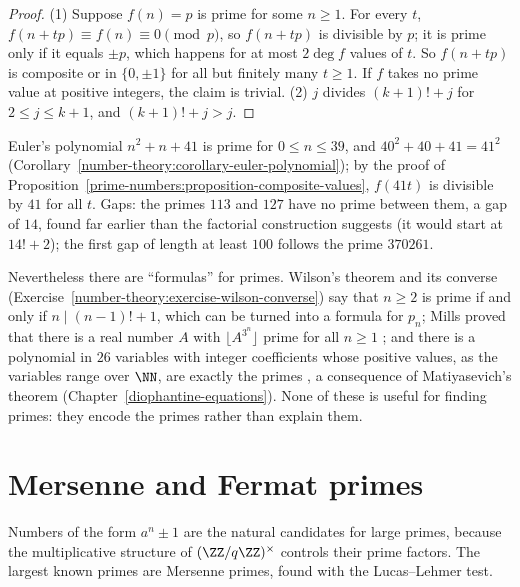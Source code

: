 \begin{proof}
(1) Suppose $f(n) = p$ is prime for some $n \geq 1$. For every $t$, $f(n + tp) \equiv f(n) \equiv 0 \pmod p$, so $f(n + tp)$ is divisible by $p$; it is prime only if it equals $\pm p$, which happens for
at most $2\deg f$ values of $t$. So $f(n + tp)$ is composite or in $\{0, \pm 1\}$ for all but finitely many $t \geq 1$. If $f$ takes no prime value at positive integers, the claim is trivial.
(2) $j$ divides $(k + 1)! + j$ for $2 \leq j \leq k + 1$, and $(k + 1)! + j > j$.
\end{proof}

\begin{example}\label{prime-numbers:example-euler-polynomial}
Euler's polynomial $n^2 + n + 41$ is prime for $0 \leq n \leq 39$, and $40^2 + 40 + 41 = 41^2$ (Corollary~\ref{number-theory:corollary-euler-polynomial}); by the proof of
Proposition~\ref{prime-numbers:proposition-composite-values}, $f(41t)$ is divisible by $41$ for all $t$. Gaps: the primes $113$ and $127$ have no prime between them, a gap of $14$, found far earlier than the factorial construction suggests (it would start at $14! + 2$); the first gap of length at least $100$ follows the prime $370261$.
\end{example}

\begin{remark}\label{prime-numbers:remark-prime-formulas}
Nevertheless there are ``formulas'' for primes. Wilson's theorem and its converse (Exercise~\ref{number-theory:exercise-wilson-converse}) say that $n \geq 2$ is prime if and only if
$n \mid (n - 1)! + 1$, which can be turned into a formula for $p_n$; Mills proved that there is a real number $A$ with $\lfloor A^{3^n}\rfloor$ prime for all $n \geq 1$ \cite{mills-prime-function}; and there is a polynomial in
$26$ variables with integer coefficients whose positive values, as the variables range over $\NN$, are exactly the primes \cite{jones-sato-wada-wiens}, a consequence of Matiyasevich's theorem
(Chapter~\ref{diophantine-equations}).
None of these is useful for finding primes: they encode the primes rather than explain them.
\end{remark}

\section{Mersenne and Fermat primes}\label{prime-numbers:section-special}

Numbers of the form $a^n \pm 1$ are the natural candidates for large primes, because the multiplicative structure of $(\ZZ/q\ZZ)^\times$ controls their prime factors. The largest known
primes are Mersenne primes, found with the Lucas--Lehmer test.

